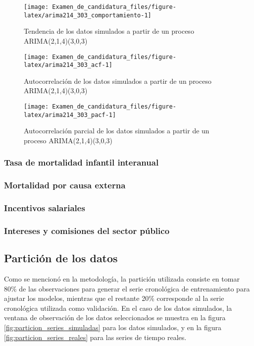 \documentclass[
]{article}
\begin{document}
\begin{figure}[H]
\texttt{[image: Examen\_de\_candidatura\_files/figure-latex/arima214\_303\_comportamiento-1]} \caption{Tendencia de los datos simulados a partir de un proceso ARIMA(2,1,4)(3,0,3)}\label{fig:arima214_303_comportamiento}
\end{figure}

\begin{figure}[H]
\texttt{[image: Examen\_de\_candidatura\_files/figure-latex/arima214\_303\_acf-1]} \caption{Autocorrelación de los datos simulados a partir de un proceso ARIMA(2,1,4)(3,0,3)}\label{fig:arima214_303_acf}
\end{figure}

\begin{figure}[H]
\texttt{[image: Examen\_de\_candidatura\_files/figure-latex/arima214\_303\_pacf-1]} \caption{Autocorrelación parcial de los datos simulados a partir de un proceso ARIMA(2,1,4)(3,0,3)}\label{fig:arima214_303_pacf}
\end{figure}

\subsubsection{Tasa de mortalidad infantil interanual}

\subsubsection{Mortalidad por causa externa}

\subsubsection{Incentivos salariales}

\subsubsection{Intereses y comisiones del sector público}

\subsection{Partición de los datos}

Como se mencionó en la metodología, la partición utilizada consiste en
tomar 80\% de las observaciones para generar el serie cronológica de
entrenamiento para ajustar los modelos, mientras que el restante 20\%
corresponde al la serie cronológica utilizada como validación. En el
caso de los datos simulados, la ventana de observación de los datos
seleccionados se muestra en la figura
\ref{fig:particion_series_simuladas} para los datos simulados, y en la
figura \ref{fig:particion_series_reales} para las series de tiempo
reales.
\end{document}
